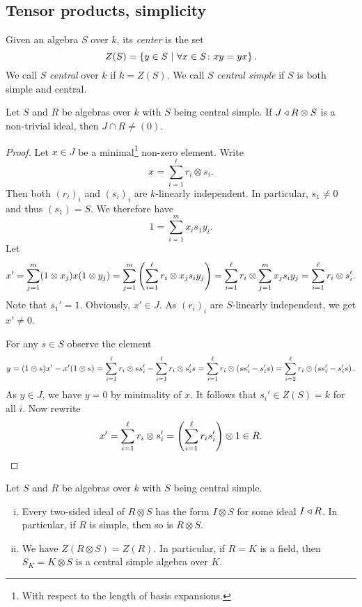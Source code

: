 \newpage

\subsection{Tensor products, simplicity}

\begin{definicija}
Given an algebra $S$ over $k$, its \emph{center} is
the set
\[
Z(S) = \left\{y \in S~\middle\vert~\forall x \in S \colon xy = yx\right\}.
\]
We call $S$ \emph{central} over $k$ if
$k = Z(S)$. We call $S$ \emph{central simple} if $S$ is both simple
and central.
\end{definicija}

\begin{lema}
Let $S$ and $R$ be algebras over $k$ with $S$ being central simple.
If $J \triangleleft R \otimes S$ is a non-trivial ideal, then
$J \cap R \ne (0)$.
\end{lema}

\begin{proof}
Let $x \in J$ be a minimal\footnote{With respect to the length of
basis expansions.} non-zero element. Write
\[
x = \sum_{i=1}^\ell r_i \otimes s_i.
\]
Then both $(r_i)_i$ and $(s_i)_i$ are $k$-linearly independent. In
particular, $s_1 \ne 0$ and thus $(s_1) = S$. We therefore have
\[
1 = \sum_{i=1}^m x_i s_1 y_i.
\]
Let
\[
x' =
\sum_{j=1}^m (1 \otimes x_j) x (1 \otimes y_j) =
\sum_{j=1}^m \left(\sum_{i=1}^\ell r_i \otimes x_j s_i y_j\right) =
\sum_{i=1}^\ell r_i \otimes \sum_{j=1}^m x_j s_i y_j =
\sum_{i=1}^\ell r_i \otimes s_i'.
\]
Note that $s_1' = 1$. Obviously, $x' \in J$. As $(r_i)_i$ are
$S$-linearly independent, we get $x' \ne 0$.

For any $s \in S$ observe the element
\[
y =
(1 \otimes s) x' - x' (1 \otimes s) =
\sum_{i=1}^\ell r_i \otimes s s_i' -
\sum_{i=1}^\ell r_i \otimes s_i' s =
\sum_{i=1}^\ell r_i \otimes \left(s s_i' - s_i' s\right) =
\sum_{i=2}^\ell r_i \otimes \left(s s_i' - s_i' s\right).
\]
As $y \in J$, we have $y = 0$ by minimality of $x$. It follows that
$s_i' \in Z(S) = k$ for all $i$. Now rewrite
\[
x' =
\sum_{i=1}^\ell r_i \otimes s_i' =
\left(\sum_{i=1}^\ell r_i s_i'\right) \otimes 1 \in R. \qedhere
\]
\end{proof}

\begin{izrek}
Let $S$ and $R$ be algebras over $k$ with $S$ being central simple.

\begin{enumerate}[i)]
\item Every two-sided ideal of $R \otimes S$ has the form
$I \otimes S$ for some ideal $I \triangleleft R$. In particular, if $R$ is
simple, then so is $R \otimes S$.
\item We have $Z(R \otimes S) = Z(R)$. In particular, if $R = K$ is
a field, then $S_K = K \otimes S$ is a central simple algebra over
$K$.
\end{enumerate}
\end{izrek}

